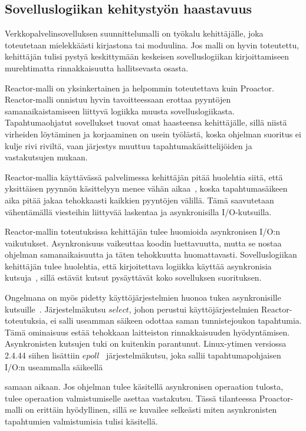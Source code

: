 \documentclass[finnish]{tktltiki2}
\theoremstyle{definition}
\theoremstyle{remark}
\begin{document}
\subsection{Sovelluslogiikan kehitystyön haastavuus}
Verkkopalvelinsovelluksen suunnittelumalli on työkalu kehittäjälle,
joka toteutetaan mielekkäästi kirjastona tai moduulina.
Jos malli on hyvin toteutettu, kehittäjän tulisi pystyä
keskittymään keskeisen sovelluslogiikan kirjoittamiseen
murehtimatta rinnakkaisuutta hallitsevasta osasta.

Reactor-malli on yksinkertainen ja helpommin toteutettava
kuin Proactor. Reactor-malli onnistuu hyvin tavoitteessaan
erottaa pyyntöjen samanaikaistamiseen liittyvä logiikka
muusta sovelluslogiikasta.
Tapahtumaohjatut sovellukset tuovat omat haasteensa
kehittäjälle, sillä niistä virheiden löytäminen ja
korjaaminen on usein työlästä, koska ohjelman
suoritus ei kulje rivi riviltä, vaan järjestys
muuttuu tapahtumakäsittelijöiden ja vastakutsujen mukaan.

Reactor-mallia käyttävässä palvelimessa kehittäjän
pitää huolehtia siitä, että yksittäisen pyynnön
käsittelyyn menee vähän aikaa~\cite{schmidt_reactor:_1995}, koska
tapahtumasäikeen aika pitää jakaa tehokkaasti
kaikkien pyyntöjen välillä. Tämä saavutetaan
vähentämällä viesteihin liittyvää laskentaa ja
asynkronisilla I/O-kutsuilla.

Reactor-mallin toteutuksissa kehittäjän tulee huomioida
asynkronisen I/O:n vaikutukset. Asynkronisuus vaikeuttaa koodin
luettavuutta, mutta se nostaa ohjelman samanaikaisuutta ja täten
tehokkuutta huomattavasti. Sovelluslogiikan kehittäjän
tulee huolehtia, että kirjoitettava logiikka
käyttää asynkronisia kutsuja~\cite{schmidt_reactor:_1995}, sillä estävät
kutsut pysäyttävät koko sovelluksen suorituksen.

Ongelmana on myös pidetty käyttöjärjestelmien huonoa
tukea asynkronisille kutsuille~\cite{pyarali_proactor_1997}. Järjestelmäkutsu
$select$, johon perustui käyttöjärjestelmien Reactor-toteutuksia,
ei salli useamman säikeen odottaa saman tunnistejoukon tapahtumia.
Tämä ominaisuus estää tehokkaan laitteiston rinnakkaisuuden hyödyntämisen.
Asynkronisten kutsujen tuki on kuitenkin parantunut.
Linux-ytimen versiossa
2.4.44 siihen lisättiin $epoll$~\cite{man_epoll} järjestelmäkutsu, joka
sallii tapahtumapohjaisen I/O:n useammalla säikeellä

samaan aikaan.
Jos ohjelman tulee käsitellä
asynkronisen operaation tulosta, tulee operaation valmistumiselle
asettaa vastakutsu. 
Tässä tilanteessa Proactor-malli on erittäin hyödyllinen, sillä se
kuvailee selkeästi miten asynkronisten tapahtumien valmistumisia tulisi käsitellä.
\end{document}
